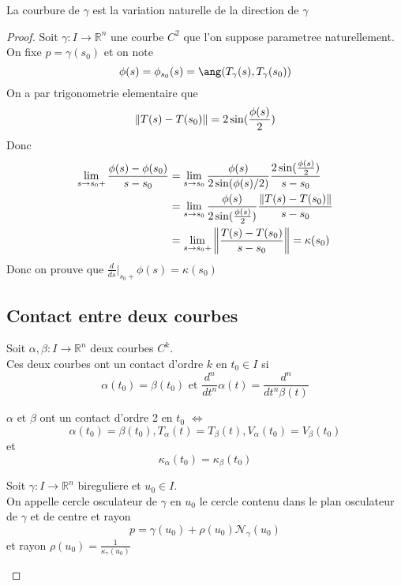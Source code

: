 \documentclass[../main.tex]{subfiles}
\begin{document}
\begin{thm}
La courbure de $\gamma$ est la variation naturelle de la direction de $\gamma$ 
\end{thm}
\begin{proof}
Soit $\gamma: I \to \mathbb{R}^n$ une courbe $C^{2}$ que l'on suppose parametree naturellement.\\
On fixe $p= \gamma( s_0) $ et on note 
\[ 
	\phi( s) = \phi_{s_0} ( s) = \ang ( T_{\gamma} ( s) ,T_{\gamma} ( s_0) ) 
\]
On a par trigonometrie elementaire que
\[ 
	\left\lVert T( s) -T( s_0) \right\rVert = 2 \sin ( \frac{\phi(s ) }{2}) 
\]
Donc
\begin{align*}
	\lim_{s \to s_0+} \frac{\phi( s) -\phi( s_0) }{s-s_0}&= \lim_{s \to s_0} \frac{\phi( s) }{2 \sin ( \phi( s) /2) } \frac{2 \sin( \frac{\phi( s) }{2}) }{s-s_0}\\
							     &= \lim_{s \to s_0} \frac{\phi( s) }{2 \sin( \frac{\phi( s) }{2}) } \frac{\left\lVert T( s) -T( s_0) \right\rVert }{s-s_0}\\
							     &= \lim_{s \to s_0 +} \left\lVert \frac{T( s) -T( s_0) }{s-s_0}\right\rVert 	= \kappa( s_0) 
\end{align*}
Donc on prouve que $\frac{d}{ds}\vert_{s_0+} \phi( s) =\kappa( s_0) $
\subsection{Contact entre deux courbes}
\begin{defn}
	Soit $\alpha,\beta: I \to \mathbb{R}^n$ deux courbes $C^{k}$.\\
	Ces deux courbes ont un contact d'ordre $k$ en $t_0\in I$ si
	\[ 
		\alpha( t_0) =\beta( t_0) \text{ et } \frac{d^{n}}{dt^{n}} \alpha( t) = \frac{d^{n}}{dt^{n}\beta( t) }
	\]
	
\end{defn}
\begin{thm}
$\alpha$ et $\beta$ ont un contact d'ordre 2 en $t_0$ $\iff$ 
\[ 
	\alpha( t_0) = \beta( t_0), T_{\alpha} ( t) = T_{\beta} ( t) , V_\alpha( t_0) = V_{\beta } ( t_0) 
\]
et
\[ 
	\kappa_{\alpha} ( t_0) = \kappa_\beta( t_0) 
\]
\end{thm}
\begin{defn}
	Soit $\gamma:I\to \mathbb{R}^n$ bireguliere et $u_0\in I$.\\
	On appelle cercle osculateur de $\gamma$ en $u_0$ le cercle contenu dans le plan osculateur de $\gamma$ et de centre et rayon
	\[ 
		p= \gamma( u_0) + \rho( u_0) \mathcal{N}_\gamma( u_0) 
	\]
	et rayon $\rho( u_0) = \frac{1}{\kappa_{\gamma} ( u_0) }$ 
	

\end{defn}
\end{proof}
\end{document}
